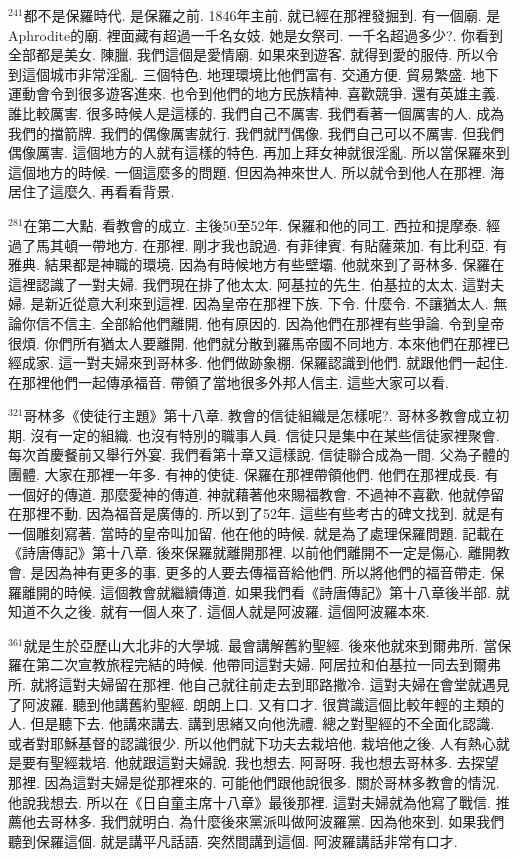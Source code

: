 \documentclass{book}
\begin{document}
$^{241}$都不是保羅時代.
是保羅之前.
1846年主前.
就已經在那裡發掘到.
有一個廟.
是Aphrodite的廟.
裡面藏有超過一千名女妓.
她是女祭司.
一千名超過多少?.
你看到全部都是美女.
陳臘.
我們這個是愛情廟.
如果來到遊客.
就得到愛的服侍.
所以令到這個城市非常淫亂.
三個特色.
地理環境比他們富有.
交通方便.
貿易繁盛.
地下運動會令到很多遊客進來.
也令到他們的地方民族精神.
喜歡競爭.
還有英雄主義.
誰比較厲害.
很多時候人是這樣的.
我們自己不厲害.
我們看著一個厲害的人.
成為我們的擋箭牌.
我們的偶像厲害就行.
我們就鬥偶像.
我們自己可以不厲害.
但我們偶像厲害.
這個地方的人就有這樣的特色.
再加上拜女神就很淫亂.
所以當保羅來到這個地方的時候.
一個這麼多的問題.
但因為神來世人.
所以就令到他人在那裡.
海居住了這麼久.
再看看背景.

$^{281}$在第二大點.
看教會的成立.
主後50至52年.
保羅和他的同工.
西拉和提摩泰.
經過了馬其頓一帶地方.
在那裡.
剛才我也說過.
有菲律賓.
有貼薩萊加.
有比利亞.
有雅典.
結果都是神職的環境.
因為有時候地方有些壁壩.
他就來到了哥林多.
保羅在這裡認識了一對夫婦.
我們現在排了他太太.
阿基拉的先生.
伯基拉的太太.
這對夫婦.
是新近從意大利來到這裡.
因為皇帝在那裡下族.
下令.
什麼令.
不讓猶太人.
無論你信不信主.
全部給他們離開.
他有原因的.
因為他們在那裡有些爭論.
令到皇帝很煩.
你們所有猶太人要離開.
他們就分散到羅馬帝國不同地方.
本來他們在那裡已經成家.
這一對夫婦來到哥林多.
他們做跡象棚.
保羅認識到他們.
就跟他們一起住.
在那裡他們一起傳承福音.
帶領了當地很多外邦人信主.
這些大家可以看.

$^{321}$哥林多《使徒行主題》第十八章.
教會的信徒組織是怎樣呢?.
哥林多教會成立初期.
沒有一定的組織.
也沒有特別的職事人員.
信徒只是集中在某些信徒家裡聚會.
每次首慶餐前又舉行外宴.
我們看第十章又這樣說.
信徒聯合成為一間.
父為子體的團體.
大家在那裡一年多.
有神的使徒.
保羅在那裡帶領他們.
他們在那裡成長.
有一個好的傳道.
那麼愛神的傳道.
神就藉著他來賜福教會.
不過神不喜歡.
他就停留在那裡不動.
因為福音是廣傳的.
所以到了52年.
這些有些考古的碑文找到.
就是有一個雕刻寫著.
當時的皇帝叫加留.
他在他的時候.
就是為了處理保羅問題.
記載在《詩唐傳記》第十八章.
後來保羅就離開那裡.
以前他們離開不一定是傷心.
離開教會.
是因為神有更多的事.
更多的人要去傳福音給他們.
所以將他們的福音帶走.
保羅離開的時候.
這個教會就繼續傳道.
如果我們看《詩唐傳記》第十八章後半部.
就知道不久之後.
就有一個人來了.
這個人就是阿波羅.
這個阿波羅本來.

$^{361}$就是生於亞歷山大北非的大學城.
最會講解舊約聖經.
後來他就來到爾弗所.
當保羅在第二次宣教旅程完結的時候.
他帶同這對夫婦.
阿居拉和伯基拉一同去到爾弗所.
就將這對夫婦留在那裡.
他自己就往前走去到耶路撒冷.
這對夫婦在會堂就遇見了阿波羅.
聽到他講舊約聖經.
朗朗上口.
又有口才.
很賞識這個比較年輕的主類的人.
但是聽下去.
他講來講去.
講到思緒又向他洗禮.
總之對聖經的不全面化認識.
或者對耶穌基督的認識很少.
所以他們就下功夫去栽培他.
栽培他之後.
人有熱心就是要有聖經栽培.
他就跟這對夫婦說.
我也想去.
阿哥呀.
我也想去哥林多.
去探望那裡.
因為這對夫婦是從那裡來的.
可能他們跟他說很多.
關於哥林多教會的情況.
他說我想去.
所以在《日自童主席十八章》最後那裡.
這對夫婦就為他寫了戰信.
推薦他去哥林多.
我們就明白.
為什麼後來黨派叫做阿波羅黨.
因為他來到.
如果我們聽到保羅這個.
就是講平凡話語.
突然間講到這個.
阿波羅講話非常有口才.
\end{document}

